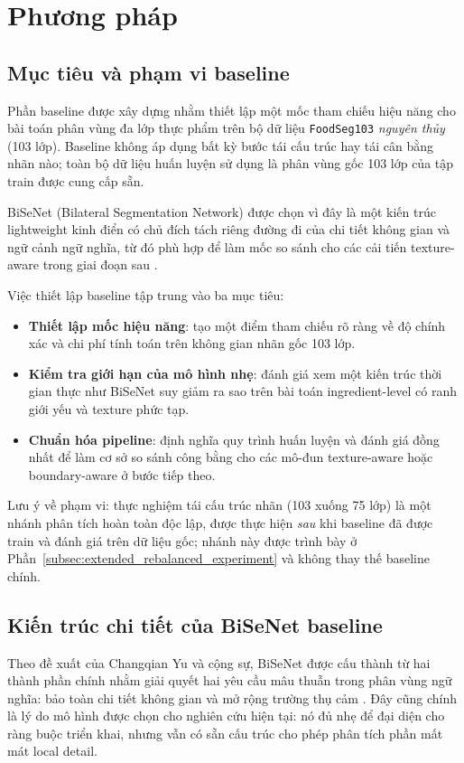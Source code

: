 \section{Phương pháp}



\subsection{Mục tiêu và phạm vi baseline}
Phần baseline được xây dựng nhằm thiết lập một mốc tham chiếu hiệu năng cho bài toán phân vùng đa lớp thực phẩm trên bộ dữ liệu \texttt{FoodSeg103} \emph{nguyên thủy} (103 lớp). Baseline không áp dụng bất kỳ bước tái cấu trúc hay tái cân bằng nhãn nào; toàn bộ dữ liệu huấn luyện sử dụng là phân vùng gốc 103 lớp của tập train được cung cấp sẵn.

BiSeNet (Bilateral Segmentation Network) được chọn vì đây là một kiến trúc lightweight kinh điển có chủ đích tách riêng đường đi của chi tiết không gian và ngữ cảnh ngữ nghĩa, từ đó phù hợp để làm mốc so sánh cho các cải tiến texture-aware trong giai đoạn sau \cite{bisenet}.

Việc thiết lập baseline tập trung vào ba mục tiêu:
\begin{itemize}[leftmargin=1.5em]
    \item \textbf{Thiết lập mốc hiệu năng}: tạo một điểm tham chiếu rõ ràng về độ chính xác và chi phí tính toán trên không gian nhãn gốc 103 lớp.
    \item \textbf{Kiểm tra giới hạn của mô hình nhẹ}: đánh giá xem một kiến trúc thời gian thực như BiSeNet suy giảm ra sao trên bài toán ingredient-level có ranh giới yếu và texture phức tạp.
    \item \textbf{Chuẩn hóa pipeline}: định nghĩa quy trình huấn luyện và đánh giá đồng nhất để làm cơ sở so sánh công bằng cho các mô-đun texture-aware hoặc boundary-aware ở bước tiếp theo.
\end{itemize}

Lưu ý về phạm vi: thực nghiệm tái cấu trúc nhãn (103 xuống 75 lớp) là một nhánh phân tích hoàn toàn độc lập, được thực hiện \emph{sau} khi baseline đã được train và đánh giá trên dữ liệu gốc; nhánh này được trình bày ở Phần~\ref{subsec:extended_rebalanced_experiment} và không thay thế baseline chính.

\subsection{Kiến trúc chi tiết của BiSeNet baseline}
Theo đề xuất của Changqian Yu và cộng sự, BiSeNet được cấu thành từ hai thành phần chính nhằm giải quyết hai yêu cầu mâu thuẫn trong phân vùng ngữ nghĩa: bảo toàn chi tiết không gian và mở rộng trường thụ cảm \cite{bisenet}. Đây cũng chính là lý do mô hình được chọn cho nghiên cứu hiện tại: nó đủ nhẹ để đại diện cho ràng buộc triển khai, nhưng vẫn có sẵn cấu trúc cho phép phân tích phần mất mát local detail.

